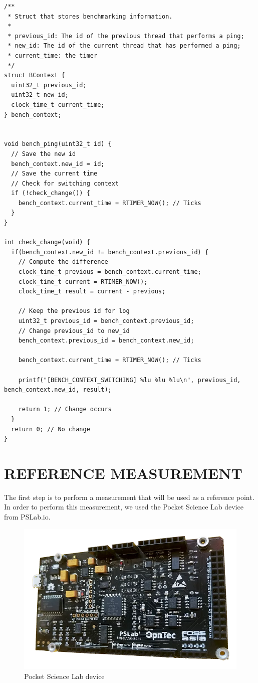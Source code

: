 \documentclass[a4paper, 10pt, conference]{ieeeconf}      %
\begin{document}
\begin{lstlisting}[style=CStyle, label={lst:code}, caption={Source code of the benchmarking framework implemented in Contiki}]
/**
 * Struct that stores benchmarking information.
 * 
 * previous_id: The id of the previous thread that performs a ping;
 * new_id: The id of the current thread that has performed a ping;
 * current_time: the timer
 */
struct BContext {
  uint32_t previous_id;
  uint32_t new_id;
  clock_time_t current_time;
} bench_context;


void bench_ping(uint32_t id) {
  // Save the new id
  bench_context.new_id = id;
  // Save the current time
  // Check for switching context
  if (!check_change()) {
    bench_context.current_time = RTIMER_NOW(); // Ticks
  }
}

int check_change(void) {
  if(bench_context.new_id != bench_context.previous_id) {
    // Compute the difference
    clock_time_t previous = bench_context.current_time;
    clock_time_t current = RTIMER_NOW();
    clock_time_t result = current - previous;

    // Keep the previous id for log
    uint32_t previous_id = bench_context.previous_id;
    // Change previous_id to new_id
    bench_context.previous_id = bench_context.new_id;

    bench_context.current_time = RTIMER_NOW(); // Ticks

    printf("[BENCH_CONTEXT_SWITCHING] %lu %lu %lu\n", previous_id, bench_context.new_id, result);
    
    return 1; // Change occurs
  }
  return 0; // No change
}
\end{lstlisting}

\section{\label{sec:ref}REFERENCE MEASUREMENT}

The first step is to perform a measurement that will be used as a reference point.
In order to perform this measurement, we used the Pocket Science Lab device from PSLab.io.

\begin{figure}[!h]
    \centering
    \includegraphics[scale=0.2]{pslab.png}
    \caption{Pocket Science Lab device}
    \label{fig:pslab}
\end{figure}
\end{document}
